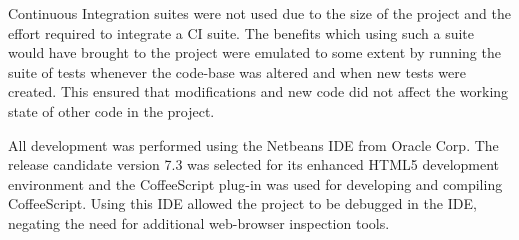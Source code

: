 Continuous Integration suites were not used due to the size of the project and the effort required to integrate a CI suite. The benefits which using such a suite would have brought to the project were emulated to some extent by running the suite of tests whenever the code-base was altered and when new tests were created. This ensured that modifications and new code did not affect the working state of other code in the project.

All development was performed using the Netbeans IDE from Oracle Corp. The release candidate version 7.3 was selected for its enhanced HTML5 development environment and the Coffee\-Script plug-in was used for developing and compiling Coffee\-Script. Using this IDE allowed the project to be debugged in the IDE, negating the need for additional web-browser inspection tools.